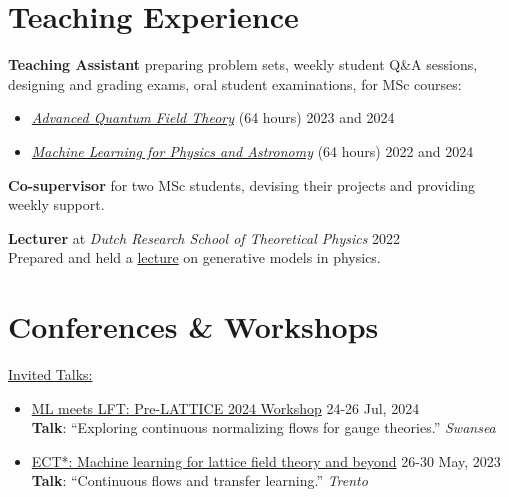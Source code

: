 \documentclass[11pt, a4paper]{article}
\newcommand{\dateright}[1]{\hfill{\small\color{accentblue} #1}}
\begin{document}
\section*{Teaching Experience}
\noindent
\textbf{Teaching Assistant} preparing problem sets, weekly student Q\&A sessions, designing and grading exams, oral student examinations, for MSc courses:
\begin{itemize}
    \item \href{https://coursecatalogue.uva.nl/xmlpages/page/2023-2024-en/search-course/course/109196}{\textit{Advanced Quantum Field Theory}} (64 hours) \dateright{2023 and 2024}
    \item \href{https://coursecatalogue.uva.nl/xmlpages/page/2022-2023-en/search-course/course/99394}{\textit{Machine Learning for Physics and Astronomy}} (64 hours) \dateright{2022 and 2024}
\end{itemize}

\vspace{0.2cm}
\noindent
\textbf{Co-supervisor} for two MSc students, devising their projects and providing weekly support.

\vspace{0.2cm}
\noindent
\textbf{Lecturer} at \textit{Dutch Research School of Theoretical Physics} \dateright{2022} \\
Prepared and held a \href{https://www.drstp.nl/wp-content/uploads/2022/06/THEP-Schedule-2022.pdf}{lecture} on generative models in physics.

\section*{Conferences \& Workshops}
\underline{Invited Talks:}
\begin{itemize}[left=0pt, itemsep=5pt]
    \item {\href{http://pyweb.swan.ac.uk/~aarts/ml-lft-2024-programme.html}{ML meets LFT: Pre-LATTICE 2024 Workshop}} \dateright{ 24-26 Jul, 2024} \\
    {\footnotesize \textbf{Talk}: “Exploring continuous normalizing flows for gauge theories.”} \dateright{{\color{black}\textit{Swansea}}}

    \item {\href{https://indico.ectstar.eu/event/171/contributions/3849/}{ECT*: Machine learning for lattice field theory and beyond}} \dateright{ 26-30 May, 2023} \\
    {\footnotesize \textbf{Talk}: “Continuous flows and transfer learning.”} \dateright{{\color{black}\textit{Trento}}}
\end{itemize}
\end{document}

